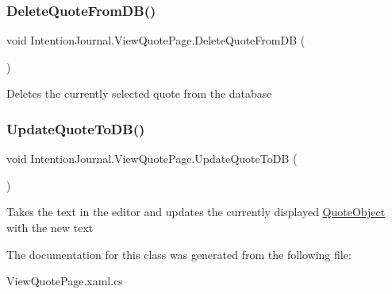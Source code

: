 \subsubsection{\texorpdfstring{Delete\+Quote\+From\+D\+B()}{DeleteQuoteFromDB()}}
{\footnotesize\ttfamily void Intention\+Journal.\+View\+Quote\+Page.\+Delete\+Quote\+From\+DB (\begin{DoxyParamCaption}{ }\end{DoxyParamCaption})\hspace{0.3cm}{\ttfamily [inline]}}



Deletes the currently selected quote from the database 

\mbox{\label{class_intention_journal_1_1_view_quote_page_af08dc7548b3a5b84ba4e5e0e608a441e}} 
\subsubsection{\texorpdfstring{Update\+Quote\+To\+D\+B()}{UpdateQuoteToDB()}}
{\footnotesize\ttfamily void Intention\+Journal.\+View\+Quote\+Page.\+Update\+Quote\+To\+DB (\begin{DoxyParamCaption}{ }\end{DoxyParamCaption})\hspace{0.3cm}{\ttfamily [inline]}}



Takes the text in the editor and updates the currently displayed \hyperlink{class_intention_journal_1_1_quote_object}{Quote\+Object} with the new text 



The documentation for this class was generated from the following file\+:\begin{DoxyCompactItemize}
\item 
View\+Quote\+Page.\+xaml.\+cs\end{DoxyCompactItemize}
